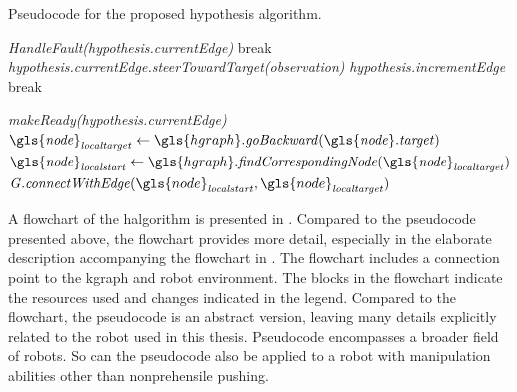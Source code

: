 \noindent
\begin{algorithm}[H]
  \caption{Pseudocode for the proposed hypothesis algorithm.}\label{pseudocode:halgorithm}
  \begin{algorithmic}[1]

    \hspace{-0.9cm}\colorbox{my_grey}{\parbox{\linewidth}{%

        \hspace{-0.1cm}\colorbox{my_yellow}{\parbox{\linewidth}{%

            \hspace{-0.1cm}\colorbox{my_light_blue}{\parbox{\linewidth}{%
                 
                \State \textit{HandleFault(\gls{hypothesis}.currentEdge)}
                \State break
                \EndIf
                \State \textit{\gls{hypothesis}.currentEdge.steerTowardTarget(\gls{observation})}
                  \State \textit{\gls{hypothesis}.incrementEdge}
                \Else
                  \State break
                \EndIf
                \EndIf
                \EndWhile
            }}
            \Else
            \State \textit{makeReady(\gls{hypothesis}.currentEdge)}
            \EndIf
            \Else
            \State $\mathit{\gls{node}_{localtarget}} \leftarrow \gls{hgraph}.\mathit{goBackward(\gls{node}.target)}$
            \State $\mathit{\gls{node}_{localstart}} \leftarrow \gls{hgraph}.\mathit{findCorrespondingNode(\gls{node}_{localtarget})}$
            \State $\mathit{G.connectWithEdge}(\gls{node}_\mathit{localstart}, \gls{node}_\mathit{localtarget})$
            \EndIf
            \EndWhile
        }}
        \EndFor
    }}
  \end{algorithmic}
\end{algorithm}

A flowchart of the \ac{halgorithm} is presented in . Compared to the pseudocode presented above, the flowchart provides more detail, especially in the elaborate description accompanying the flowchart in . The flowchart includes a connection point to the \ac{kgraph} and robot environment. The blocks in the flowchart indicate the resources used and changes indicated in the legend. Compared to the flowchart, the pseudocode is an abstract version, leaving many details explicitly related to the robot used in this thesis. Pseudocode encompasses a broader field of robots. So can the pseudocode also be applied to a robot with manipulation abilities other than nonprehensile pushing.\bs

